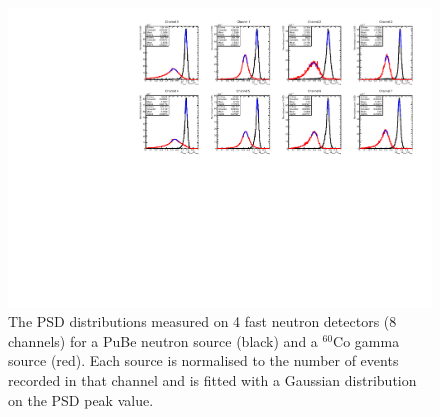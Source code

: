 \begin{figure}[htbp]
\begin{center}
\includegraphics[width=160mm]{Chapter8/figures/psd_allChannels_pube_co60_withPeaksAndCutsAndNoShift.pdf}
\caption{The PSD distributions measured on 4 fast neutron detectors (8 channels) for a PuBe neutron source (black) and a $^{60}$Co gamma source (red). Each source is normalised to the number of events recorded in that channel and is fitted with a Gaussian distribution on the PSD peak value.}
\label{fig:modesPSDAllChannelsRaw}
\end{center}
\end{figure}

